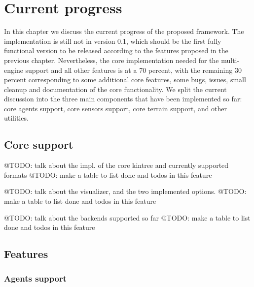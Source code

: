 
\chapter{Current progress}
\label{ch:current_progress}



In this chapter we discuss the current progress of the proposed framework. The implementation
is still not in version 0.1, which should be the first fully functional version to be released
according to the features proposed in the previous chapter. Nevertheless, the core implementation
needed for the multi-engine support and all other features is at a 70 percent, 
with the remaining
30 percent corresponding to some additional core features, some bugs, issues, small cleanup and 
documentation of the core functionality. We split the current discussion into the three main 
components that have been implemented so far: core agents support, core sensors support, core 
terrain support, and other utilities.

\section{Core support}

@TODO: talk about the impl. of the core kintree and currently supported formats
@TODO: make a table to list done and todos in this feature

@TODO: talk about the visualizer, and the two implemented options.
@TODO: make a table to list done and todos in this feature

@TODO: talk about the backends supported so far
@TODO: make a table to list done and todos in this feature

\section{Features}

\subsection*{Agents support}

